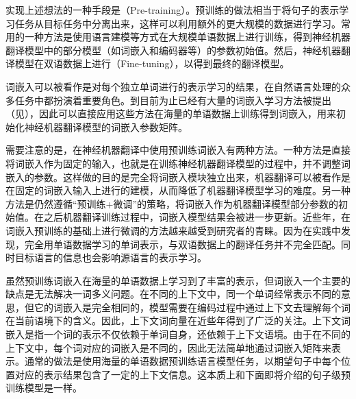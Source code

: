 \parinterval 实现上述想法的一种手段是{\small\sffamily{}}（Pre-training）。预训练的做法相当于将句子的表示学习任务从目标任务中分离出来，这样可以利用额外的更大规模的数据进行学习。常用的一种方法是使用语言建模等方式在大规模单语数据上进行训练，得到神经机器翻译模型中的部分模型（如词嵌入和编码器等）的参数初始值。然后，神经机器翻译模型在双语数据上进行{\small\sffamily{}}（Fine-tuning），以得到最终的翻译模型。

\parinterval 词嵌入可以被看作是对每个独立单词进行的表示学习的结果，在自然语言处理的众多任务中都扮演着重要角色。到目前为止已经有大量的词嵌入学习方法被提出（见{\chapternine}），因此可以直接应用这些方法在海量的单语数据上训练得到词嵌入，用来初始化神经机器翻译模型的词嵌入参数矩阵。

\parinterval 需要注意的是，在神经机器翻译中使用预训练词嵌入有两种方法。一种方法是直接将词嵌入作为固定的输入，也就是在训练神经机器翻译模型的过程中，并不调整词嵌入的参数。这样做的目的是完全将词嵌入模块独立出来，机器翻译可以被看作是在固定的词嵌入输入上进行的建模，从而降低了机器翻译模型学习的难度。另一种方法是仍然遵循``预训练+微调''的策略，将词嵌入作为机器翻译模型部分参数的初始值。在之后机器翻译训练过程中，词嵌入模型结果会被进一步更新。近些年，在词嵌入预训练的基础上进行微调的方法越来越受到研究者的青睐。因为在实践中发现，完全用单语数据学习的单词表示，与双语数据上的翻译任务并不完全匹配。同时目标语言的信息也会影响源语言的表示学习。

\parinterval 虽然预训练词嵌入在海量的单语数据上学习到了丰富的表示，但词嵌入一个主要的缺点是无法解决一词多义问题。在不同的上下文中，同一个单词经常表示不同的意思，但它的词嵌入是完全相同的，模型需要在编码过程中通过上下文去理解每个词在当前语境下的含义。因此，上下文词向量在近些年得到了广泛的关注。上下文词嵌入是指一个词的表示不仅依赖于单词自身，还依赖于上下文语境。由于在不同的上下文中，每个词对应的词嵌入是不同的，因此无法简单地通过词嵌入矩阵来表示。通常的做法是使用海量的单语数据预训练语言模型任务，以期望句子中每个位置对应的表示结果包含了一定的上下文信息。这本质上和下面即将介绍的句子级预训练模型是一样。

